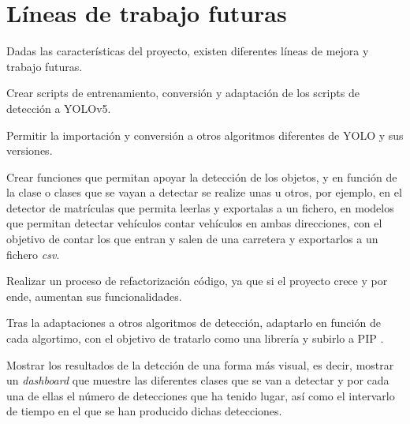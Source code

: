 \section{Líneas de trabajo futuras}
Dadas las características del proyecto, existen diferentes líneas de mejora y trabajo futuras.

\begin{list}{\textbullet}{ %
    \addtolength{\itemsep}{-2mm} %
    \setlength{\itemindent}{2mm}}
    \item Crear scripts de entrenamiento, conversión y adaptación de los scripts de detección a YOLOv5.
    \item Permitir la importación y conversión a otros algoritmos diferentes de YOLO y sus versiones.
    \item Crear funciones que permitan apoyar la detección de los objetos, y en función de la clase o clases que se vayan a detectar se realize unas u otros, por ejemplo, en el detector de matrículas que permita leerlas y exportalas a un fichero, en modelos que permitan detectar vehículos contar vehículos en ambas direcciones, con el objetivo de contar los que entran y salen de una carretera y exportarlos a un fichero \textit{csv}.
    \item Realizar un proceso de refactorización código, ya que si el proyecto crece y por ende, aumentan sus funcionalidades.
    \item Tras la adaptaciones a otros algoritmos de detección, adaptarlo en función de cada algortimo, con el objetivo de tratarlo como una librería y subirlo a PIP \cite{pip}.
    \item Mostrar los resultados de la detcción de una forma más visual, es decir, mostrar un \textit{dashboard} que muestre las diferentes clases que se van a detectar y por cada una de ellas el número de detecciones que ha tenido lugar, así como el intervarlo de tiempo en el que se han producido dichas detecciones.
\end{list}